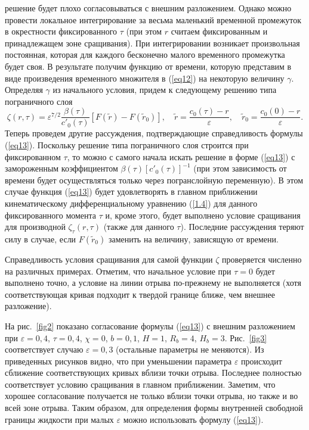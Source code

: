 \documentclass[press]{vestnik}
\begin{document}
решение будет плохо согласовываться с внешним разложением. Однако можно 
провести локальное интегрирование за весьма маленький временной промежуток в 
окрестности фиксированного $\tau $ (при этом $r$ считаем фиксированным и 
принадлежащем зоне сращивания). При интегрировании возникает произвольная 
постоянная, которая для каждого бесконечно малого временного промежутка 
будет своя. В результате получим функцию от времени, которую представим в 
виде произведения временного множителя в (\ref{eq12}) на некоторую величину 
$\gamma $. Определяя $\gamma$ из начального условия, придем к 
следующему решению типа пограничного слоя
\begin{equation}
\label{eq13}
\zeta (r,\tau )=\varepsilon^{7/2}\frac{\beta (\tau )}{{c}'_{0} (\tau 
)}\left[ {F(\tilde{{r}})-F(\tilde{{r}}_{0} )} \right] ,
\quad
\tilde{{r}}=\frac{c_{0} (\tau )-r}{\varepsilon } ,
\quad
\tilde{{r}}_{0} =\frac{c_{0} (0)-r}{\varepsilon }.
\end{equation}
Теперь проведем другие рассуждения, подтверждающие справедливость формулы 
(\ref{eq13}). Поскольку решение типа пограничного слоя строится при фиксированном 
$\tau $, то можно с самого начала искать решение в форме (\ref{eq13}) с 
замороженным коэффициентом $\beta (\tau )[{c}'_{0} (\tau )]^{-1}$ (при этом 
зависимость от времени будет осуществляться только через погранслойную 
переменную). В этом случае функция (\ref{eq13}) будет удовлетворять в главном 
приближении кинематическому дифференциальному уравнению (\ref{1.4}) для данного 
фиксированного момента $\tau $ и, кроме этого, будет выполнено условие 
сращивания для производной $\zeta_{\tau } (r,\tau )$ (также для данного 
$\tau$). Последние рассуждения теряют силу в случае, если 
$F(\tilde{{r}}_{0} )$ заменить на величину, зависящую от времени.

Справедливость условия сращивания для самой функции $\zeta $ проверяется 
численно на различных примерах. Отметим, что начальное условие при $\tau =0$ 
будет выполнено точно, а условие на линии отрыва по-прежнему не выполняется 
(хотя соответствующая кривая подходит к твердой границе ближе, чем внешнее 
разложение).

На рис.~\ref{fig2} показано согласование формулы (\ref{eq13}) с внешним разложением при 
$\varepsilon =0,4$, $\tau =0,4$, $\chi =0$, $b=0,1$, $H=1$, $R_{b} =4$, 
$H_{b} =3$. Рис.~\ref{fig3} соответствует случаю $\varepsilon =0,3$ (остальные 
параметры не меняются). Из приведенных рисунков видно, что при уменьшении 
параметра $\varepsilon $ происходит сближение соответствующих кривых вблизи 
точки отрыва. Последнее полностью соответствует условию сращивания в главном 
приближении. Заметим, что хорошее согласование получается не только вблизи 
точки отрыва, но также и во всей зоне отрыва. Таким образом, для определения 
формы внутренней свободной границы жидкости при малых $\varepsilon $ можно 
использовать формулу (\ref{eq13}). 
\end{document}
